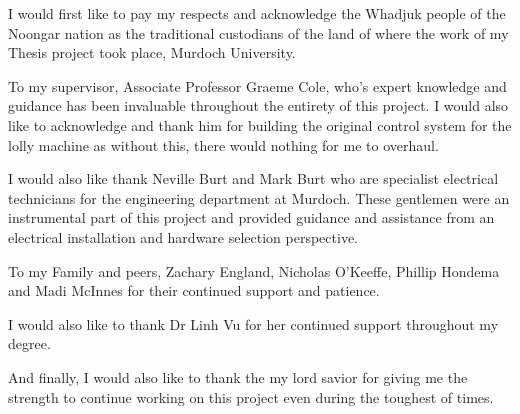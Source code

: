 I would first like to pay my respects and acknowledge the Whadjuk people of the Noongar nation as the traditional custodians of the land of where the work of my Thesis project took place, Murdoch University.

To my supervisor, Associate Professor Graeme Cole,  who's expert knowledge and guidance has been invaluable throughout the entirety of this project. I would also like to acknowledge and thank him for building the original control system for the lolly machine as without this, there would nothing for me to overhaul.

I would also like thank Neville Burt and Mark Burt who are specialist electrical technicians for the engineering department at Murdoch. These gentlemen were an instrumental part of this project and provided guidance and assistance from an electrical installation and hardware selection perspective.

To my Family and peers, Zachary England, Nicholas O'Keeffe, Phillip Hondema and Madi McInnes for their continued support and patience.

I would also like to thank Dr Linh Vu for her continued support throughout my degree. 

And finally, I would also like to thank the my lord savior for giving me the strength to continue working on this project even during the toughest of times.
